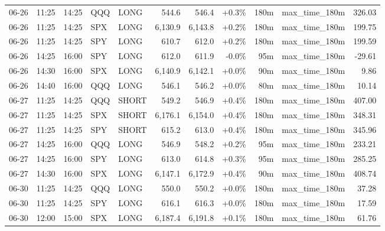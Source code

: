 \documentclass[11pt,a4paper,twoside]{article}
\begin{document}
\begin{center}
\begin{longtable}{>{\color{txtmain}}l l l l l r r r r >{\color{txtmain}}l r}
06-26 & 11:25 & 14:25 & QQQ & LONG & 544.6 & 546.4 & \textcolor{wingreen}{+0.3\%} & 180m & max\_time\_180m & \textcolor{wingreen}{326.03} \\
06-26 & 11:25 & 14:25 & SPX & LONG & 6,130.9 & 6,143.8 & \textcolor{wingreen}{+0.2\%} & 180m & max\_time\_180m & \textcolor{wingreen}{199.75} \\
06-26 & 11:25 & 14:25 & SPY & LONG & 610.7 & 612.0 & \textcolor{wingreen}{+0.2\%} & 180m & max\_time\_180m & \textcolor{wingreen}{199.59} \\
06-26 & 14:25 & 16:00 & SPY & LONG & 612.0 & 611.9 & \textcolor{lossred}{-0.0\%} & 95m & max\_time\_180m & \textcolor{lossred}{-29.61} \\
06-26 & 14:30 & 16:00 & SPX & LONG & 6,140.9 & 6,142.1 & \textcolor{wingreen}{+0.0\%} & 90m & max\_time\_180m & \textcolor{wingreen}{9.86} \\
06-26 & 14:40 & 16:00 & QQQ & LONG & 546.1 & 546.2 & \textcolor{wingreen}{+0.0\%} & 80m & max\_time\_180m & \textcolor{wingreen}{10.14} \\
06-27 & 11:25 & 14:25 & QQQ & SHORT & 549.2 & 546.9 & \textcolor{wingreen}{+0.4\%} & 180m & max\_time\_180m & \textcolor{wingreen}{407.00} \\
06-27 & 11:25 & 14:25 & SPX & SHORT & 6,176.1 & 6,154.0 & \textcolor{wingreen}{+0.4\%} & 180m & max\_time\_180m & \textcolor{wingreen}{348.31} \\
06-27 & 11:25 & 14:25 & SPY & SHORT & 615.2 & 613.0 & \textcolor{wingreen}{+0.4\%} & 180m & max\_time\_180m & \textcolor{wingreen}{345.96} \\
06-27 & 14:25 & 16:00 & QQQ & LONG & 546.9 & 548.2 & \textcolor{wingreen}{+0.2\%} & 95m & max\_time\_180m & \textcolor{wingreen}{233.21} \\
06-27 & 14:25 & 16:00 & SPY & LONG & 613.0 & 614.8 & \textcolor{wingreen}{+0.3\%} & 95m & max\_time\_180m & \textcolor{wingreen}{285.25} \\
06-27 & 14:30 & 16:00 & SPX & LONG & 6,147.1 & 6,172.9 & \textcolor{wingreen}{+0.4\%} & 90m & max\_time\_180m & \textcolor{wingreen}{408.74} \\
06-30 & 11:25 & 14:25 & QQQ & LONG & 550.0 & 550.2 & \textcolor{wingreen}{+0.0\%} & 180m & max\_time\_180m & \textcolor{wingreen}{37.28} \\
06-30 & 11:25 & 14:25 & SPY & LONG & 616.1 & 616.3 & \textcolor{wingreen}{+0.0\%} & 180m & max\_time\_180m & \textcolor{wingreen}{17.59} \\
06-30 & 12:00 & 15:00 & SPX & LONG & 6,187.4 & 6,191.8 & \textcolor{wingreen}{+0.1\%} & 180m & max\_time\_180m & \textcolor{wingreen}{61.76} \\

\end{longtable}
\end{center}
\end{document}
